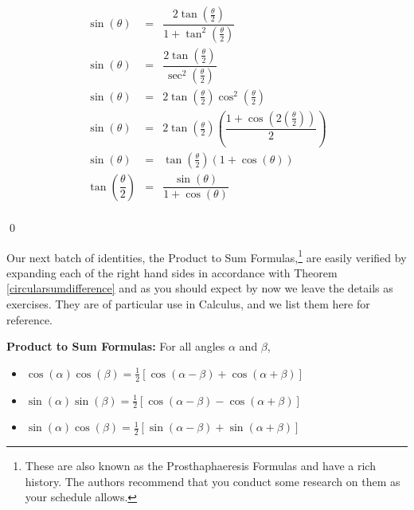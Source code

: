 \begin{ex}
\begin{enumerate}
\[\begin{array}{rcl}
\sin(\theta) & = &  \dfrac{2\tan\left(\frac{\theta}{2}\right)}{1 + \tan^{2}\left(\frac{\theta}{2}\right)} \\ [15pt]
\sin(\theta) & = & \dfrac{2\tan\left(\frac{\theta}{2}\right)}{\sec^{2}\left(\frac{\theta}{2}\right)} \\ [15pt]
\sin(\theta) & = & 2 \tan\left(\frac{\theta}{2}\right) \cos^{2}\left(\frac{\theta}{2}\right) \\ [5pt]
\sin(\theta) & = & 2 \tan\left(\frac{\theta}{2}\right) \left(\dfrac{1 + \cos\left(2 \left(\frac{\theta}{2}\right)\right)}{2}\right) \\ [15pt]
\sin(\theta) & = &  \tan\left(\frac{\theta}{2}\right) \left(1+\cos(\theta) \right) \\ [5pt]
\tan\left(\dfrac{\theta}{2}\right) & = & \dfrac{\sin(\theta)}{1+\cos(\theta)} \\ 
\end{array}  \]

\qed

\end{enumerate}

\end{ex}


Our next batch of identities, the Product to Sum Formulas,\footnote{These are also known as the Prosthaphaeresis Formulas and have a rich history.  The authors recommend that you conduct some research on them as your schedule allows.} are easily verified by expanding each of the right hand sides in accordance with Theorem \ref{circularsumdifference} and as you should expect by now we leave the details as exercises.  They are of particular use in Calculus, and we list them here for reference.

\smallskip

\colorbox{ResultColor}{\bbm

\begin{thm} \label{producttosum}  \textbf{Product to Sum Formulas:} For all angles $\alpha$ and $\beta$, 

\begin{itemize}

\item  $\cos(\alpha)\cos(\beta) = \frac{1}{2} \left[ \cos(\alpha - \beta) + \cos(\alpha + \beta)\right]$

\item  $\sin(\alpha)\sin(\beta) = \frac{1}{2} \left[ \cos(\alpha - \beta) - \cos(\alpha + \beta)\right]$

\item  $\sin(\alpha)\cos(\beta) = \frac{1}{2} \left[ \sin(\alpha - \beta) + \sin(\alpha + \beta)\right]$

\end{itemize}

\end{thm}

\ebm}

